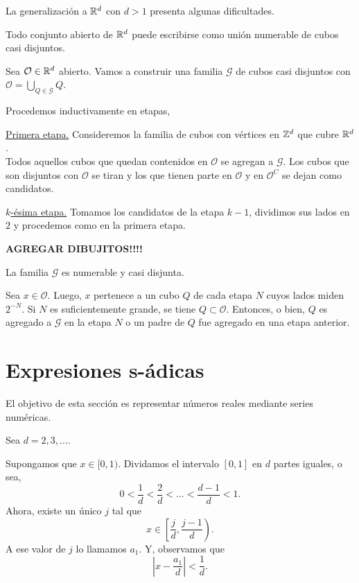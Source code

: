 La generalizaci\'on a $\mathbb{R}^d$ con $d>1$ presenta algunas dificultades.

\begin{teorema}{}
Todo conjunto abierto de $\mathbb{R}^d$ puede escribirse como uni\'on numerable de cubos casi disjuntos.
\end{teorema}

\begin{demo}
Sea $\mathcal{O}\in \mathbb{R}^d$ abierto. Vamos a construir una familia $\mathcal{G}$ de cubos casi disjuntos con $\mathcal{O}=\bigcup\limits_{Q \in \mathcal{G}} Q$.

Procedemos inductivamente en etapas, 

\underline{Primera etapa.}
Consideremos la familia de cubos con v\'ertices en $\mathbb{Z}^d$ que cubre $\mathbb{R}^d$.
\\
Todos aquellos cubos que quedan contenidos en $\mathcal{O}$ se agregan a $\mathcal{G}$.  Los  cubos  que son disjuntos con $\mathcal{O}$ se tiran y los que tienen parte en $\mathcal{O}$ y en $\mathcal{O}^C$ se dejan  como candidatos.

\underline{$k$-\'esima  etapa.}
Tomamos los candidatos de la etapa $k-1$, dividimos sus lados en $2$ y procedemos como en la primera etapa. 

\textbf{
AGREGAR DIBUJITOS!!!!}

La familia $\mathcal{G}$ es numerable y casi disjunta. 

Sea $x\in \mathcal{O}$. Luego,  $x$ pertenece a un cubo $Q$ de cada etapa $N$ cuyos lados miden $2^{-N}$. Si $N$ es suficientemente grande, se tiene  $Q\subset \mathcal{O}$. Entonces, o bien, $Q$ es agregado a $\mathcal{G}$ en la etapa $N$ o un padre de $Q$ fue agregado en una etapa anterior.
 \end{demo}
 
 \section{Expresiones s-\'adicas}
 
 El objetivo de esta secci\'on es representar n\'umeros reales mediante series num\'ericas.
 
 Sea $d=2,3,\ldots$. 
 
 Supongamos que $x \in [0,1)$. Dividamos el intervalo  $[0,1]$ en $d$ partes iguales, o sea, 
 \[
 0<\frac{1}{d}<\frac{2}{d}<\ldots<\frac{d-1}{d}<1.
 \]
 Ahora, existe un \'unico $j$ tal que 
 \[
 x \in \left[\frac{j}{d}, \frac{j-1}{d}\right).
 \]
 A ese valor de $j$ lo llamamos $a_1$. 
 Y, observamos que \[ \left|x-\frac{a_1}{d}\right|<\frac{1}{d}.\]
 
